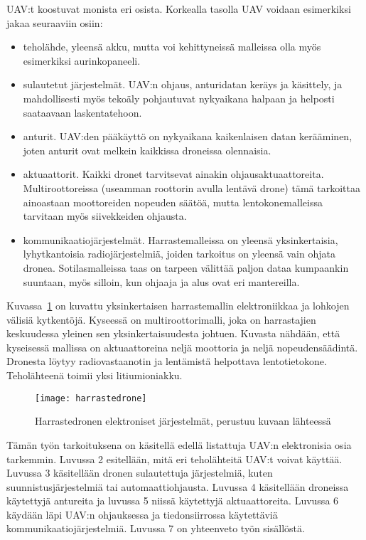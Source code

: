 UAV:t koostuvat monista eri osista. Korkealla tasolla UAV voidaan esimerkiksi
jakaa seuraaviin osiin:
\begin{itemize}

\item teholähde, yleensä akku, mutta voi kehittyneissä malleissa olla myös
esimerkiksi aurinkopaneeli.

\item sulautetut järjestelmät. UAV:n ohjaus, anturidatan keräys ja käsittely,
ja mahdollisesti myös tekoäly pohjautuvat nykyaikana halpaan ja helposti
saataavaan laskentatehoon.

\item anturit. UAV:den pääkäyttö on nykyaikana kaikenlaisen datan kerääminen,
joten anturit ovat melkein kaikkissa droneissa olennaisia.

\item aktuaattorit. Kaikki dronet tarvitsevat ainakin ohjausaktuaattoreita.
Multiroottoreissa (useamman roottorin avulla lentävä drone) tämä tarkoittaa
ainoastaan moottoreiden nopeuden säätöä, mutta lentokonemalleissa tarvitaan myös
siivekkeiden ohjausta.

\item kommunikaatiojärjestelmät. Harrastemalleissa on yleensä yksinkertaisia,
lyhytkantoisia radiojärjestelmiä, joiden tarkoitus on yleensä vain ohjata
dronea. Sotilasmalleissa taas on tarpeen välittää paljon dataa kumpaankin
suuntaan, myös silloin, kun ohjaaja ja alus ovat eri mantereilla.
\end{itemize}

Kuvassa~\ref{fig:harrastedrone} on kuvattu yksinkertaisen harrastemallin
elektroniikkaa ja lohkojen välisiä kytkentöjä. Kyseessä on
multiroottorimalli, joka on harrastajien keskuudessa yleinen sen
yksinkertaisuudesta johtuen. Kuvasta nähdään, että kyseisessä mallissa on
aktuaattoreina neljä moottoria ja neljä nopeudensäädintä. Dronesta löytyy
radiovastaanotin ja lentämistä helpottava lentotietokone. Teholähteenä toimii
yksi litiumioniakku.
\begin{figure}[H]
  \begin{center}
    \texttt{[image: harrastedrone]}
  \end{center}
  \caption{Harrastedronen elektroniset järjestelmät, perustuu kuvaan lähteessä~\cite{RedditQuad}}
\label{fig:harrastedrone}
\end{figure}


Tämän työn tarkoituksena on käsitellä edellä listattuja UAV:n elektronisia osia
tarkemmin.
Luvussa 2 esitellään, mitä eri teholähteitä UAV:t voivat käyttää.
Luvussa 3 käsitellään dronen sulautettuja järjestelmiä, kuten
suunnistusjärjestelmiä tai automaattiohjausta.
Luvussa 4 käsitellään droneissa käytettyjä antureita ja luvussa 5 niissä
käytettyjä aktuaattoreita.
Luvussa 6 käydään läpi UAV:n ohjauksessa ja tiedonsiirrossa käytettäviä
kommunikaatiojärjestelmiä.
Luvussa 7 on yhteenveto työn sisällöstä.
